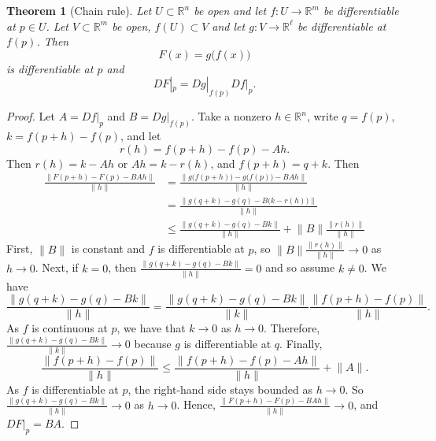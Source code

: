 \documentclass[12pt,openany]{book}
\newcommand{\snorm}[1]{\lVert {#1} \rVert}
\newcommand{\bnorm}[1]{\bigl\lVert {#1} \bigr\rVert}
\newcommand{\R}{{\mathbb{R}}}
\theoremstyle{plain}
\newtheorem{thm}{Theorem}[section]
\theoremstyle{remark}
\theoremstyle{definition}
\theoremstyle{exercise}
\theoremstyle{example}
\begin{document}
\begin{thm}[Chain rule] \label{thm:realchain}
Let $U \subset \R^n$ be open and let $f \colon U \to \R^m$ be
differentiable at $p \in U$.  Let $V \subset \R^m$ be open,
$f(U) \subset V$ and let $g \colon V \to \R^\ell$ be differentiable
at $f(p)$.  Then
\begin{equation*}
F(x) = g\bigl(f(x)\bigr)
\end{equation*}
is differentiable at $p$ and
\begin{equation*}
DF|_p = Dg|_{f(p)} Df|_p .
\end{equation*}
\end{thm}

\begin{proof}
Let $A = Df|_p$ and $B = Dg|_{f(p)}$.  Take a nonzero $h \in \R^n$,
write $q = f(p)$, $k = f(p+h)-f(p)$, and let
\begin{equation*}
r(h) = f(p+h)-f(p) - A h .
\end{equation*}
Then $r(h) = k-Ah$ or $Ah = k-r(h)$, and $f(p+h) = q+k$.
Then
\begin{equation*}
\begin{split}
\frac{\snorm{F(p+h)-F(p) - BAh}}{\snorm{h}}
& =
\frac{\bnorm{g\bigl(f(p+h)\bigr)-g\bigl(f(p)\bigr) - BAh}}{\snorm{h}}
\\
& =
\frac{\bnorm{g(q+k)-g(q) - B\bigl(k-r(h)\bigr)}}{\snorm{h}}
\\
& \leq
\frac
{\snorm{g(q+k)-g(q) - Bk}}
{\snorm{h}}
+
\snorm{B}
\frac
{\snorm{r(h)}}
{\snorm{h}}
\end{split}
\end{equation*}
First, $\snorm{B}$ is constant and $f$ is differentiable at $p$,
so
$\snorm{B}\frac{\snorm{r(h)}}{\snorm{h}} \to 0$
as $h \to 0$.
Next,
if $k=0$, then $\frac
{\snorm{g(q+k)-g(q) - Bk}}
{\snorm{h}} = 0$ and so assume $k \neq 0$.  We have
\begin{equation*}
\frac
{\snorm{g(q+k)-g(q) - Bk}}
{\snorm{h}}
=
\frac
{\snorm{g(q+k)-g(q) - Bk}}
{\snorm{k}}
\frac
{\snorm{f(p+h)-f(p)}}
{\snorm{h}} .
\end{equation*}
As $f$ is continuous at $p$, we have that
$k \to 0$ as
$h \to 0$.
Therefore,
$\frac
{\snorm{g(q+k)-g(q) - Bk}}
{\snorm{k}} \to 0$ because $g$ is differentiable at $q$.
Finally,
\begin{equation*}
\frac
{\snorm{f(p+h)-f(p)}}
{\snorm{h}}
\leq
\frac
{\snorm{f(p+h)-f(p)-Ah}}
{\snorm{h}}
+
\snorm{A} .
\end{equation*}
As $f$ is differentiable at $p$,
the right-hand side stays bounded as $h \to 0$.
So
$\frac
{\snorm{g(q+k)-g(q) - Bk}}
{\snorm{h}} \to 0$ as $h \to 0$.
Hence, 
$\frac{\snorm{F(p+h)-F(p) - BAh}}{\snorm{h}} \to 0$, and
$DF|_p = BA$.
\end{proof}
\end{document}
